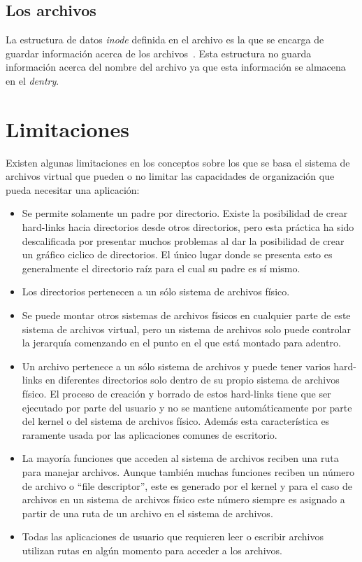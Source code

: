 \subsection{Los archivos}

La estructura de datos \textit{inode} definida en el archivo  es la que se encarga de guardar información acerca de los archivos~\cite{inode:wikipedia}. Esta estructura no guarda información acerca del nombre del archivo ya que esta información se almacena en el \textit{dentry}.


\section{Limitaciones}

Existen algunas limitaciones en los conceptos sobre los que se basa el sistema de archivos virtual que pueden o no limitar las capacidades de organización que pueda necesitar una aplicación:

\begin{itemize}
\item Se permite solamente un padre por directorio. Existe la posibilidad de crear hard-links hacia directorios desde otros directorios, pero esta práctica ha sido descalificada por presentar muchos problemas al dar la posibilidad de crear un gráfico ciclico de directorios. El único lugar donde se presenta esto es generalmente el directorio raíz para el cual su padre es sí mismo.
\item Los directorios pertenecen a un sólo sistema de archivos físico.
\item Se puede montar otros sistemas de archivos físicos en cualquier parte de este sistema de archivos virtual, pero un sistema de archivos solo puede controlar la jerarquía comenzando en el punto en el que está montado para adentro.
\item Un archivo pertenece a un sólo sistema de archivos y puede tener varios hard-links en diferentes directorios solo dentro de su propio sistema de archivos físico. El proceso de creación y borrado de estos hard-links tiene que ser ejecutado por parte del usuario y no se mantiene automáticamente por parte del kernel o del sistema de archivos físico. Además esta característica es raramente usada por las aplicaciones comunes de escritorio.
\item La mayoría funciones que acceden al sistema de archivos reciben una ruta para manejar archivos. Aunque también muchas funciones reciben un número de archivo o ``file descriptor'', este es generado por el kernel y para el caso de archivos en un sistema de archivos físico este número siempre es asignado a partir de una ruta de un archivo en el sistema de archivos.
\item Todas las aplicaciones de usuario que requieren leer o escribir archivos utilizan rutas en algún momento para acceder a los archivos.
\end{itemize}

